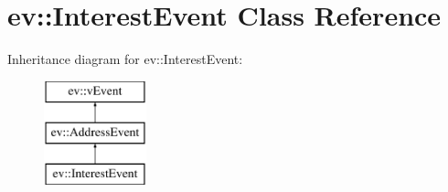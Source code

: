 \hypertarget{classev_1_1InterestEvent}{}\section{ev\+:\+:Interest\+Event Class Reference}
\label{classev_1_1InterestEvent}
Inheritance diagram for ev\+:\+:Interest\+Event\+:\begin{figure}[H]
\begin{center}
\leavevmode
\includegraphics[height=3.000000cm]{classev_1_1InterestEvent}
\end{center}
\end{figure}
